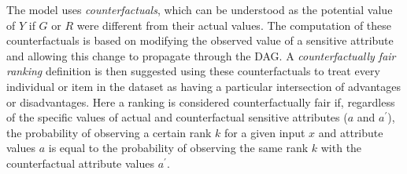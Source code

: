 

The model uses \emph{counterfactuals}, which can be understood as the potential value of $Y$ if $G$ or $R$ were different from their actual values. The computation of these counterfactuals is based on modifying the observed value of a sensitive attribute and allowing this change to propagate through the DAG.
A \emph{counterfactually fair ranking} definition is then suggested
using these counterfactuals to treat every individual or item in the dataset as having a particular intersection of advantages or disadvantages.
Here a ranking 
 is considered counterfactually fair if, regardless of the specific values of actual and counterfactual sensitive attributes ($a$ and $a^{\prime}$), the probability of observing a certain rank $k$ for a given input $x$ and attribute values $a$ is equal to the probability of observing the same rank $k$ with the counterfactual attribute values $a^{\prime}$.

